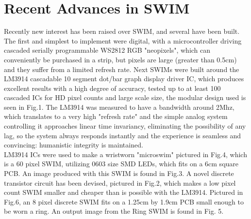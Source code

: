 \documentclass[conference]{sig-alternate-05-2015}
\begin{document}
\section{Recent Advances in SWIM}
Recently new interest has been raised over SWIM, and several have been built.
The first and simplest to implement were digital, with a microcontroller driving cascaded serially programmable WS2812 RGB "neopixels", which can conveniently be purchased in a strip, but pixels are large (greater than 0.5cm) and they suffer from a limited refresh rate. 
Next SWIMs were built around the LM3914 cascadable 10 segment dot/bar graph display driver IC, which produces excellent results with a high degree of accuracy, tested up to at least 100 cascaded ICs for HD pixel counts and large scale size, the modular design used is seen in Fig.1.
The LM3914 was measured to have a bandwidth around 2Mhz, which translates to a very high "refresh rate" and the simple analog system controlling it approaches linear time invariancy, eliminating the possibility of any lag, so the system always responds instantly and the experience is seamless and convincing: humanistic integrity is maintained.\\
LM3914 ICs were used to make a wristworn "microswim" pictured in Fig.4, which is a 60 pixel SWIM, utilizing 0603 size SMD LEDs, which fits on a 6cm square PCB. An image produced with this SWIM is found in Fig.3. 
A novel discrete transistor circuit has been devised, pictured in Fig.2, which makes a low pixel count SWIM smaller and cheaper than is possible with the LM3914. Pictured in Fig.6, an 8 pixel discrete SWIM fits on a 1.25cm by 1.9cm PCB small enough to be worn a ring. An output image from the Ring SWIM is found in Fig. 5.
%
\end{document}

